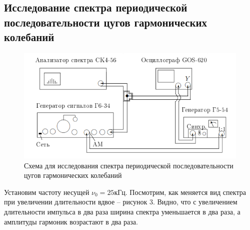\documentclass[a4paper, fontsize = 14pt]{article}
\begin{document}
\newpage

\subsection*{Исследование спектра периодической последовательности цугов гармонических колебаний}

\begin{figure}[hbt]
	\centering
	\includegraphics[scale=0.8]{lab361ris8.png}
	\caption{Схема для исследования спектра периодической последовательности цугов гармонических колебаний}
\end{figure}

Установим частоту несущей $\nu_0 = 25 кГц$. Посмотрим, как меняется вид спектра при увеличении длительности вдвое -- рисунок 3. Видно, что с увеличением длительности импульса в два раза ширина спектра уменьшается в два раза, а амплитуды гармоник возрастают в два раза.
\end{document}
